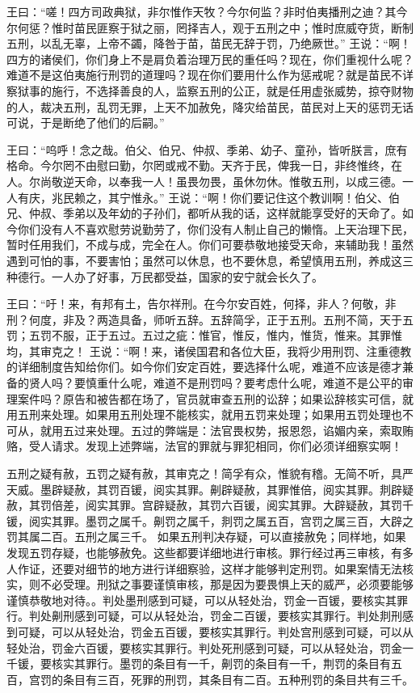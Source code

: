 \documentclass[a4paper,12pt,UTF8,twoside]{ctexbook}
\begin{document}
王曰：“嗟！四方司政典狱，非尔惟作天牧？今尔何监？非时伯夷播刑之迪？其今尔何惩？惟时苗民匪察于狱之丽，罔择吉人，观于五刑之中；惟时庶威夺货，断制五刑，以乱无辜，上帝不蠲，降咎于苗，苗民无辞于罚，乃绝厥世。”
王说：“啊！四方的诸侯们，你们身上不是肩负着治理万民的重任吗？现在，你们重视什么呢？难道不是这伯夷施行刑罚的道理吗？现在你们要用什么作为惩戒呢？就是苗民不详察狱事的施行，不选择善良的人，监察五刑的公正，就是任用虚张威势，掠夺财物的人，裁决五刑，乱罚无罪，上天不加赦免，降灾给苗民，苗民对上天的惩罚无话可说，于是断绝了他们的后嗣。”

王曰：“呜呼！念之哉。伯父、伯兄、仲叔、季弟、幼子、童孙，皆听朕言，庶有格命。今尔罔不由慰曰勤，尔罔或戒不勤。天齐于民，俾我一日，非终惟终，在人。尔尚敬逆天命，以奉我一人！虽畏勿畏，虽休勿休。惟敬五刑，以成三德。一人有庆，兆民赖之，其宁惟永。”
王说：“啊！你们要记住这个教训啊！伯父、伯兄、仲叔、季弟以及年幼的子孙们，都听从我的话，这样就能享受好的天命了。如今你们没有人不喜欢慰劳说勤劳了，你们没有人制止自己的懒惰。上天治理下民，暂时任用我们，不成与成，完全在人。你们可要恭敬地接受天命，来辅助我！虽然遇到可怕的事，不要害怕；虽然可以休息，也不要休息，希望慎用五刑，养成这三种德行。一人办了好事，万民都受益，国家的安宁就会长久了。

王曰：“吁！来，有邦有土，告尔祥刑。在今尔安百姓，何择，非人？何敬，非刑？何度，非及？两造具备，师听五辞。五辞简孚，正于五刑。五刑不简，天于五罚；五罚不服，正于五过。五过之疵：惟官，惟反，惟内，惟货，惟来。其罪惟均，其审克之！
王说：“啊！来，诸侯国君和各位大臣，我将少用刑罚、注重德教的详细制度告知给你们。如今你们安定百姓，要选择什么呢，难道不应该是德才兼备的贤人吗？要慎重什么呢，难道不是刑罚吗？要考虑什么呢，难道不是公平的审理案件吗？原告和被告都在场了，官员就审查五刑的讼辞；如果讼辞核实可信，就用五刑来处理。如果用五刑处理不能核实，就用五罚来处理；如果用五罚处理也不可从，就用五过来处理。五过的弊端是：法官畏权势，报恩怨，谄媚内亲，索取贿赂，受人请求。发现上述弊端，法官的罪就与罪犯相同，你们必须详细察实啊！

五刑之疑有赦，五罚之疑有赦，其审克之！简孚有众，惟貌有稽。无简不听，具严天威。墨辟疑赦，其罚百锾，阅实其罪。劓辟疑赦，其罪惟倍，阅实其罪。剕辟疑赦，其罚倍差，阅实其罪。宫辟疑赦，其罚六百锾，阅实其罪。大辟疑赦，其罚千锾，阅实其罪。墨罚之属千。劓罚之属千，剕罚之属五百，宫罚之属三百，大辟之罚其属二百。五刑之属三千。
如果五刑判决存疑，可以直接赦免；同样地，如果发现五罚存疑，也能够赦免。这些都要详细地进行审核。罪行经过再三审核，有多人作证，还要对细节的地方进行详细察验，这样才能够判定刑罚。如果案情无法核实，则不必受理。刑狱之事要谨慎审核，那是因为要畏惧上天的威严，必须要能够谨慎恭敬地对待。。判处墨刑感到可疑，可以从轻处治，罚金一百锾，要核实其罪行。判处劓刑感到可疑，可以从轻处治，罚金二百锾，要核实其罪行。判处剕刑感到可疑，可以从轻处治，罚金五百锾，要核实其罪行。判处宫刑感到可疑，可以从轻处治，罚金六百锾，要核实其罪行。判处死刑感到可疑，可以从轻处治，罚金一千锾，要核实其罪行。墨罚的条目有一千，劓罚的条目有一千，荆罚的条目有五百，宫罚的条目有三百，死罪的刑罚，其条目有二百。五种刑罚的条目共有三千。
\end{document}
